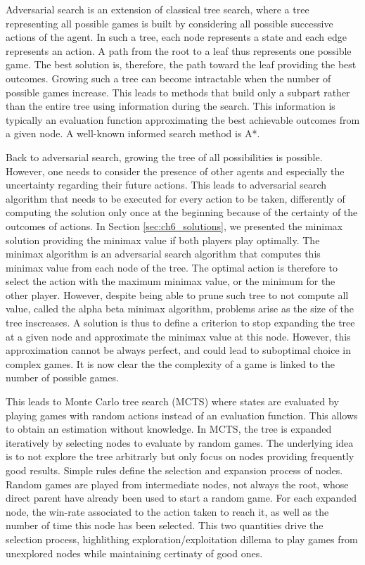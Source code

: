 Adversarial search is an extension of classical tree search, where a tree representing all possible games is built by considering all possible successive actions of the agent.
In such a tree, each node represents a state and each edge represents an action. 
A path from the root to a leaf thus represents one possible game.
The best solution is, therefore, the path toward the leaf providing the best outcomes.
Growing such a tree can become intractable when the number of possible games increase.
This leads to methods that build only a subpart rather than the entire tree using information during the search.
This information is typically an evaluation function approximating the best achievable outcomes from a given node.
A well-known informed search method is A*.

Back to adversarial search, growing the tree of all possibilities is possible.
However, one needs to consider the presence of other agents and especially the uncertainty regarding their future actions.
This leads to adversarial search algorithm that needs to be executed for every action to be taken, differently of computing the solution only once at the beginning because of the certainty of the outcomes of actions.
In Section \ref{sec:ch6_solutions}, we presented the minimax solution providing the minimax value if both players play optimally.
The minimax algorithm is an adversarial search algorithm that computes this minimax value from each node of the tree.
The optimal action is therefore to select the action with the maximum minimax value, or the minimum for the other player.
However, despite being able to prune such tree to not compute all value, called the alpha beta minimax algorithm, problems arise as the size of the tree inscreases.
A solution is thus to define a criterion to stop expanding the tree at a given node and approximate the minimax value at this node.
However, this approximation cannot be always perfect, and could lead to suboptimal choice in complex games.
It is now clear the the complexity of a game is linked to the number of possible games.

This leads to Monte Carlo tree search (MCTS) where states are evaluated by playing games with random actions instead of an evaluation function.
This allows to obtain an estimation without knowledge.
In MCTS, the tree is expanded iteratively by selecting nodes to evaluate by random games.
The underlying idea is to not explore the tree arbitrarly but only focus on nodes providing frequently good results.
Simple rules define the selection and expansion process of nodes.
Random games are played from intermediate nodes, not always the root, whose direct parent have already been used to start a random game.
For each expanded node, the win-rate associated to the action taken to reach it, as well as the number of time this node has been selected.
This two quantities drive the selection process, highlithing exploration/exploitation dillema to play games from unexplored nodes while maintaining certinaty of good ones.

